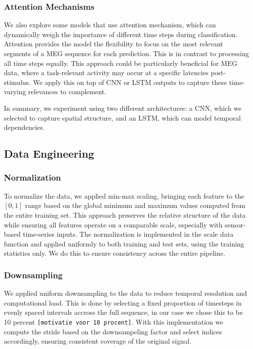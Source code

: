 \documentclass[conference]{IEEEtran}
\begin{document}
\subsubsection{Attention Mechanisms}
We also explore some models that use attention mechanism, which can dynamically weigh the importance of different time steps during classification. Attention provides the model the flexibility to focus on the most relevant segments of a MEG sequence for each prediction. This is in contrast to processing all time steps equally. This approach could be particularly beneficial for MEG data, where a task-relevant activity may occur at a specific latencies post-stimulus. We apply this on top of CNN or LSTM outputs to capture these time-varying relevances to complement.

In summary, we experiment using two different architectures: a CNN, which we selected to capture spatial structure, and an LSTM, which can model temporal dependencies. 

\subsection{Data Engineering}

\subsubsection{Normalization}
To normalize the data, we applied min-max scaling, bringing each feature to the $[0,1]$ range based on the global minimum and maximum values computed from the entire training set.
 This approach preserves the relative structure of the data while ensuring all features operate on a comparable scale, especially with sensor-based time-series inputs.
The normalization is implemented in the scale data function and applied uniformly to both training and test sets, using the training statistics only. We do this to ensure consistency across the entire pipeline.

\subsubsection{Downsampling}
We applied uniform downsampling to the data to reduce temporal resolution and computational load. 
This is done by selecting a fixed proportion of timesteps in evenly spaced intervals accross the full sequence, in our case we chose this to be 10 percent \texttt{[motivatie voor 10 procent]}.
 With this implementation we compute the stride based on the downsampeling factor and select indices accordingly, ensuring consistent coverage of the original signal. 
\end{document}
